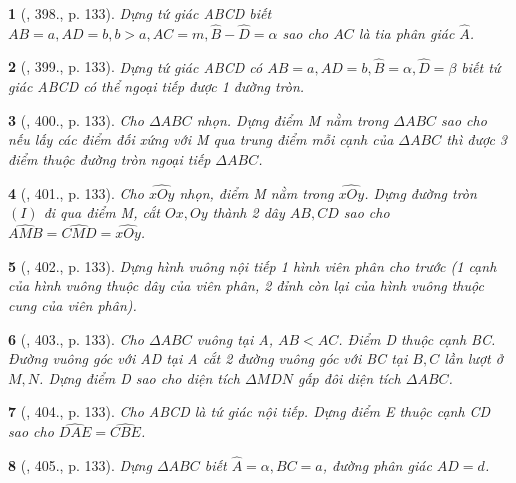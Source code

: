 \documentclass{article}
\newtheorem{baitoan}{}
\begin{document}
\begin{baitoan}[\cite{Binh_Toan_9_tap_2}, 398., p. 133]
	Dựng tứ giác ABCD biết $AB = a,AD = b,b > a,AC = m,\widehat{B} - \widehat{D} = \alpha$ sao cho $AC$ là tia phân giác $\widehat{A}$.
\end{baitoan}

\begin{baitoan}[\cite{Binh_Toan_9_tap_2}, 399., p. 133]
	Dựng tứ giác ABCD có $AB = a,AD = b,\widehat{B} = \alpha,\widehat{D} = \beta$ biết tứ giác ABCD có thể ngoại tiếp được 1 đường tròn.
\end{baitoan}

\begin{baitoan}[\cite{Binh_Toan_9_tap_2}, 400., p. 133]
	Cho $\Delta ABC$ nhọn. Dựng điểm M nằm trong $\Delta ABC$ sao cho nếu lấy các điểm đối xứng với M qua trung điểm mỗi cạnh của $\Delta ABC$ thì được 3 điểm thuộc đường tròn ngoại tiếp $\Delta ABC$.
\end{baitoan}

\begin{baitoan}[\cite{Binh_Toan_9_tap_2}, 401., p. 133]
	Cho $\widehat{xOy}$ nhọn, điểm M nằm trong $\widehat{xOy}$. Dựng đường tròn $(I)$ đi qua điểm M, cắt $Ox,Oy$ thành 2 dây $AB,CD$ sao cho $\widehat{AMB} = \widehat{CMD} = \widehat{xOy}$.
\end{baitoan}

\begin{baitoan}[\cite{Binh_Toan_9_tap_2}, 402., p. 133]
	Dựng hình vuông nội tiếp 1 hình viên phân cho trước (1 cạnh của hình vuông thuộc dây của viên phân, 2 đỉnh còn lại của hình vuông thuộc cung của viên phân).
\end{baitoan}

\begin{baitoan}[\cite{Binh_Toan_9_tap_2}, 403., p. 133]
	Cho $\Delta ABC$ vuông tại A, $AB < AC$. Điểm D thuộc cạnh BC. Đường vuông góc với AD tại A cắt 2 đường vuông góc với BC tại $B,C$ lần lượt ở $M,N$. Dựng điểm D sao cho diện tích $\Delta MDN$ gấp đôi diện tích $\Delta ABC$.
\end{baitoan}

\begin{baitoan}[\cite{Binh_Toan_9_tap_2}, 404., p. 133]
	Cho ABCD là tứ giác nội tiếp. Dựng điểm E thuộc cạnh CD sao cho $\widehat{DAE} = \widehat{CBE}$.
\end{baitoan}

\begin{baitoan}[\cite{Binh_Toan_9_tap_2}, 405., p. 133]
	Dựng $\Delta ABC$ biết $\widehat{A} = \alpha,BC = a$, đường phân giác $AD = d$.
\end{baitoan}
\end{document}
